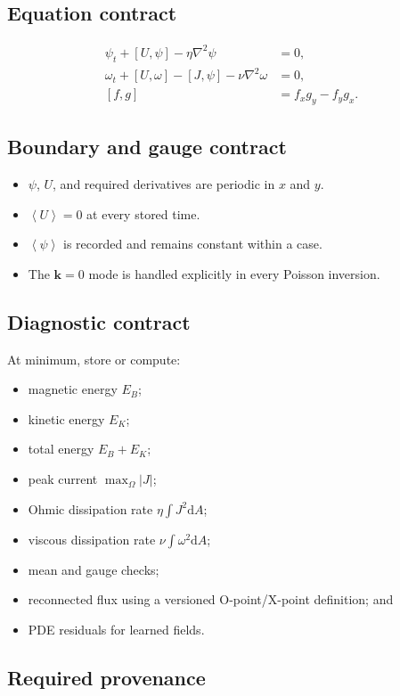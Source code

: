 \documentclass[11pt]{article}
\newcommand{\dd}{\mathrm{d}}
\newcommand{\vect}[1]{\bm{#1}}
\newcommand{\average}[1]{\left\langle #1\right\rangle}
\begin{document}
\subsection{Equation contract}

\begin{align}
\psi_t+[U,\psi]-\eta\nabla^2\psi&=0,\\
\omega_t+[U,\omega]-[J,\psi]-\nu\nabla^2\omega&=0,\\
[f,g]&=f_xg_y-f_yg_x.
\end{align}

\subsection{Boundary and gauge contract}

\begin{itemize}
  \item $\psi$, $U$, and required derivatives are periodic in $x$ and $y$.
  \item $\average{U}=0$ at every stored time.
  \item $\average{\psi}$ is recorded and remains constant within a case.
  \item The $\vect{k}=0$ mode is handled explicitly in every Poisson inversion.
\end{itemize}

\subsection{Diagnostic contract}

At minimum, store or compute:
\begin{itemize}
  \item magnetic energy $E_B$;
  \item kinetic energy $E_K$;
  \item total energy $E_B+E_K$;
  \item peak current $\max_{\Omega}|J|$;
  \item Ohmic dissipation rate $\eta\int J^2\dd A$;
  \item viscous dissipation rate $\nu\int\omega^2\dd A$;
  \item mean and gauge checks;
  \item reconnected flux using a versioned O-point/X-point definition; and
  \item PDE residuals for learned fields.
\end{itemize}

\subsection{Required provenance}
\end{document}
